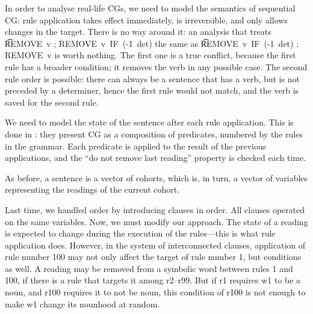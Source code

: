 In order to analyse real-life CGs, we need to model the semantics of sequential CG: 
rule application takes effect immediately, is irreversible, and only allows changes in the target.
There is no way around it: an analysis that treats \t{REMOVE~v ; REMOVE~v~IF~(-1~det)} the same as \t{REMOVE~v~IF~(-1~det) ; REMOVE~v} is worth nothing. The first one is a true conflict, because the first rule has a broader condition; it removes the verb in any possible case. The second rule order is possible: there can always be a sentence that has a verb, but is not preceded by a determiner, hence the first rule would not match, and the verb is saved for the second rule. 



We need to model the state of the sentence after each rule application. 
This is done in \cite{lager_nivre01}: they present CG as a composition of predicates, 
numbered by the rules in the grammar. Each predicate is applied to the result of the previous 
applications, and the ``do not remove last reading'' property is checked each time.


As before, a sentence is a vector of cohorts, which is, in turn, a vector of variables representing the readings of the current cohort.

Last time, we handled order by introducing clauses in order. All clauses operated on the same variables. Now, we must modify our approach. The state of a reading is expected to change during the execution of the rules---this is what rule application does. However, in the system of interconnected clauses, application of rule number 100 may not only affect the target of rule number 1, but conditions as well. 
A reading may be removed from a symbolic word between rules 1 and 100, if there is a rule that targets it among r2--r99. But if r1 requires w1 to be a noun, and r100 requires it to not be noun, this condition of r100 is not enough to make w1 change its nounhood at random.

